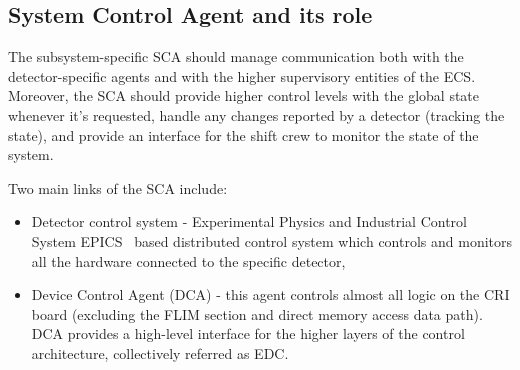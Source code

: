 \subsection{System Control Agent and its role}
The subsystem-specific \gls{SCA} should manage communication both with the detector-specific agents and with the higher supervisory entities of the \gls{ECS}. Moreover, the \gls{SCA} should provide higher control levels with the global state whenever it's requested, handle any changes reported by a detector (tracking the state), and provide an interface for the shift crew to monitor the state of the system. 

Two main links of the \gls{SCA} include:
\begin{itemize}
    \item Detector control system - Experimental Physics and Industrial Control System \gls{EPICS}~\cite{EPICS} based distributed control system which controls and monitors all the hardware connected to the specific detector,
    \item Device Control Agent (\gls{DCA}) - this agent controls almost all logic on the \gls{CRI} board (excluding the \gls{FLIM} section and direct memory access data path). \gls{DCA} provides a high-level interface for the higher layers of the control architecture, collectively referred as \gls{EDC}. 
\end{itemize}










